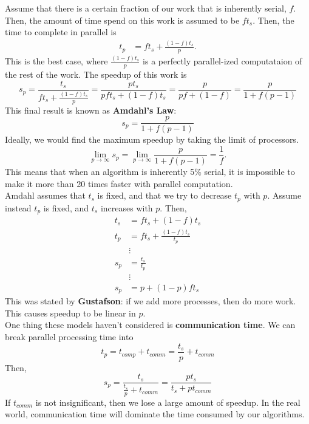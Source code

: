 \documentclass[12pt]{article}
\numberwithin{equation}{section}
\theoremstyle{theorem}
\theoremstyle{definition}
\theoremstyle{remark}
\begin{document}
Assume that there is a certain fraction of our work that is inherently serial, $f$.  Then, the amount of time spend on this work is assumed to be $ft_s$.  Then, the time to complete in parallel is
\begin{align}
t_p &= ft_s + \frac{(1-f)t_s}{p}.
\end{align}
This is the best case, where $\frac{(1-f)t_s}{p}$ is a perfectly parallel-ized computataion of the rest of the work.  The speedup of this work is
\begin{equation}
s_p = \frac{t_s}{ft_s + \frac{(1 - f)t_s}{p}} = \frac{pt_s}{pft_s + (1-f)t_s} = \frac{p}{pf + (1 - f)} = \frac{p}{1 + f(p-1)}
\end{equation}
This final result is known as \textbf{Amdahl's Law}:
\begin{equation}
s_p = \frac{p}{1 + f(p - 1)}
\end{equation}
Ideally, we would find the maximum speedup by taking the limit of processors.
\begin{equation}
\lim_{p\to\infty}s_p = \lim_{p\to\infty} \frac{p}{1 + f(p - 1)} = \frac{1}{f}.
\end{equation}
This means that when an algorithm is inherently 5\% serial, it is impossible to make it more than 20 times faster with parallel computation. \\

Amdahl assumes that $t_s$ is fixed, and that we try to decrease $t_p$ with $p$.  Assume instead $t_p$ is fixed, and $t_s$  increases with $p$.  Then, 
\begin{align}
t_s &= ft_s + (1 - f)t_s \\
t_p &= ft_s + \frac{(1 - f)t_s}{t_p} \\
&\vdots \\
s_p &= \frac{t_s}{t_p} \\
&\vdots \\
s_p &= p + (1 - p)ft_s
\end{align}
This was stated by \textbf{Gustafson}: if we add more processes, then do more work.  This causes speedup to be linear in $p$. \\

One thing these models haven't considered is \textbf{communication time}.  We can break parallel processing time into
\begin{equation}
t_p = t_{comp} + t_{comm} = \frac{t_s}{p} + t_{comm}
\end{equation}
Then,
\begin{equation}
s_p = \frac{t_s}{\frac{t_s}{p} + t_{comm}} = \frac{pt_s}{t_s + pt_{comm}}
\end{equation}
If $t_{comm}$ is not insignificant, then we lose a large amount of speedup.  In the real world, communication time will dominate the time consumed by our algorithms.
\end{document}
